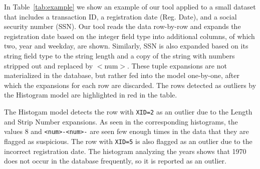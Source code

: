 In Table~\ref{tab:example} we show an example of our tool applied to a small dataset that includes a transaction ID, a registration date (Reg. Date), and a social security number (SSN).
Our tool reads the data row-by-row and expands the registration date based on the integer field type into additional columns, of which two, year and weekday, are shown.
Similarly, SSN is also expanded based on its string field type to the string length and a copy of the string with numbers stripped out and replaced by $<$num$>$.
These tuple expansions are not materialized in the database, but rather fed into the model one-by-one, after which the expansions for each row are discarded.
The rows detected as outliers by the Histogram model are highlighted in red in the table. 

The Histogam model detects the row with \texttt{XID=2} as an outlier due to the Length and Strip Number expansions.
As seen in the corresponding histograms, the values 8 and \texttt{<num>-<num>-} are seen few enough times in the data that they are flagged as suspicious.
The row with \texttt{XID=5} is also flagged as an outlier due to the incorrect registration date.
The histogram analyzing the years shows that 1970 does not occur in the database frequently, so it is reported as an outlier. 

